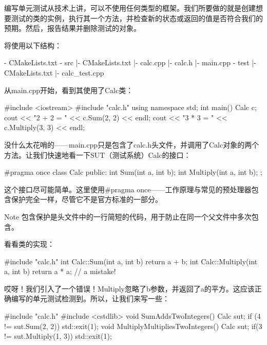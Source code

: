 编写单元测试从技术上讲，可以不使用任何类型的框架。我们所要做的就是创建想要测试的类的实例，执行其一个方法，并检查新的状态或返回的值是否符合我们的预期。然后，报告结果并删除测试的对象。

将使用以下结构：

\begin{shell}
- CMakeLists.txt
- src
  |- CMakeLists.txt
  |- calc.cpp
  |- calc.h
  |- main.cpp
- test
  |- CMakeLists.txt
  |- calc_test.cpp
\end{shell}

从main.cpp开始，看到其使用了Calc类：


\begin{cpp}
#include <iostream>
#include "calc.h"
using namespace std;
int main() {
    Calc c;
    cout << "2 + 2 = " << c.Sum(2, 2) << endl;
    cout << "3 * 3 = " << c.Multiply(3, 3) << endl;
}
\end{cpp}

没什么太花哨的——main.cpp只是包含了calc.h头文件，并调用了Calc对象的两个方法。让我们快速地看一下SUT（测试系统）Calc的接口：


\begin{cpp}
#pragma once
class Calc {
    public:
    int Sum(int a, int b);
    int Multiply(int a, int b);
};
\end{cpp}

这个接口尽可能简单。这里使用\#pragma once——工作原理与常见的预处理器包含保护完全一样，尽管它不是官方标准的一部分。

\begin{myNotic}{Note}
包含保护是头文件中的一行简短的代码，用于防止在同一个父文件中多次包含。
\end{myNotic}

看看类的实现：


\begin{cpp}
#include "calc.h"
int Calc::Sum(int a, int b) {
    return a + b;
}
int Calc::Multiply(int a, int b) {
    return a * a; // a mistake!
}
\end{cpp}

哎呀！我们引入了一个错误！Multiply忽略了b参数，并返回了a的平方。这应该正确编写的单元测试检测到。所以，让我们来写一些：


\begin{cpp}
#include "calc.h"
#include <cstdlib>
void SumAddsTwoIntegers() {
    Calc sut;
    if (4 != sut.Sum(2, 2))
        std::exit(1);
}
void MultiplyMultipliesTwoIntegers() {
    Calc sut;
    if(3 != sut.Multiply(1, 3))
    std::exit(1);
}
\end{cpp}

